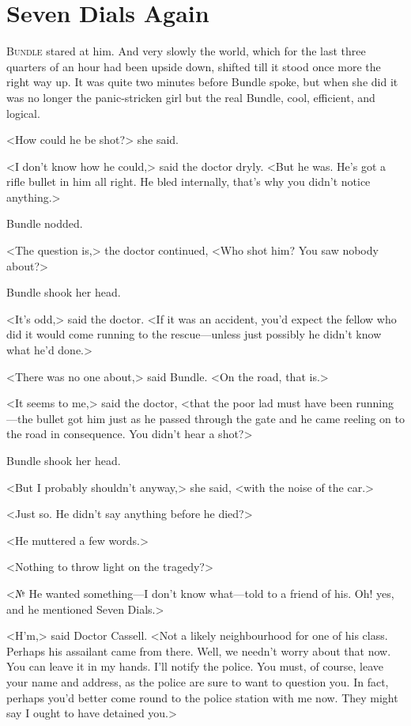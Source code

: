 \chapter{Seven Dials Again}

\lettrine{B}{undle} stared at him. And very slowly the world, which for the last three quarters of an hour had been upside down, shifted till it stood once more the right way up. It was quite two minutes before Bundle spoke, but when she did it was no longer the panic-stricken girl but the real Bundle, cool, efficient, and logical.

<How could he be shot?> she said.

<I don't know how he could,> said the doctor dryly. <But he was. He's got a rifle bullet in him all right. He bled internally, that's why you didn't notice anything.>

Bundle nodded.

<The question is,> the doctor continued, <Who shot him? You saw nobody about?>

Bundle shook her head.

<It's odd,> said the doctor. <If it was an accident, you'd expect the fellow who did it would come running to the rescue—unless just possibly he didn't know what he'd done.>

<There was no one about,> said Bundle. <On the road, that is.>

<It seems to me,> said the doctor, <that the poor lad must have been running—the bullet got him just as he passed through the gate and he came reeling on to the road in consequence. You didn't hear a shot?>

Bundle shook her head.

<But I probably shouldn't anyway,> she said, <with the noise of the car.>

<Just so. He didn't say anything before he died?>

<He muttered a few words.>

<Nothing to throw light on the tragedy?>

<№ He wanted something—I don't know what—told to a friend of his. Oh! yes, and he mentioned Seven Dials.>

<H'm,> said Doctor Cassell. <Not a likely neighbourhood for one of his class. Perhaps his assailant came from there. Well, we needn't worry about that now. You can leave it in my hands. I'll notify the police. You must, of course, leave your name and address, as the police are sure to want to question you. In fact, perhaps you'd better come round to the police station with me now. They might say I ought to have detained you.>

